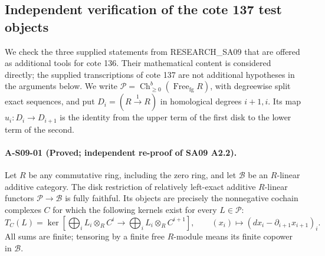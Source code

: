\subsection{Independent verification of the cote 137 test objects}
\label{sec:cosimplicial-recheck}

We check the three supplied statements from RESEARCH\_SA09 that are
offered as additional tools for cote 136.  Their mathematical content
is considered directly; the supplied transcriptions of cote 137 are
not additional hypotheses in the arguments below.  We write
$\mathcal P=\operatorname{Ch}^{b}_{\geq0}
(\operatorname{Free}_{\mathrm{fg}}R)$, with degreewise split exact
sequences, and put $D_i=(R\xrightarrow{1}R)$ in homological degrees
$i+1,i$.  Its map $u_i:D_i\to D_{i+1}$ is the identity from the upper
term of the first disk to the lower term of the second.

\paragraph{A-S09-01 (Proved; independent re-proof of SA09 A2.2).}
Let $R$ be any commutative ring, including the zero ring, and let
$\mathcal B$ be an $R$-linear additive category.  The disk restriction
of relatively left-exact additive $R$-linear functors
$\mathcal P\to\mathcal B$ is fully faithful.  Its objects are precisely
the nonnegative cochain complexes $C$ for which the following kernels
exist for every $L\in\mathcal P$:
\[
 T_C(L)=\ker\left[
 \bigoplus_i L_i\otimes_R C^i\longrightarrow
 \bigoplus_i L_i\otimes_R C^{i+1}\right],
 \qquad
 (x_i)\longmapsto(d x_i-\partial_{i+1}x_{i+1})_i .
 \tag{S09.1}
\]
All sums are finite; tensoring by a finite free $R$-module means its
finite copower in $\mathcal B$.

